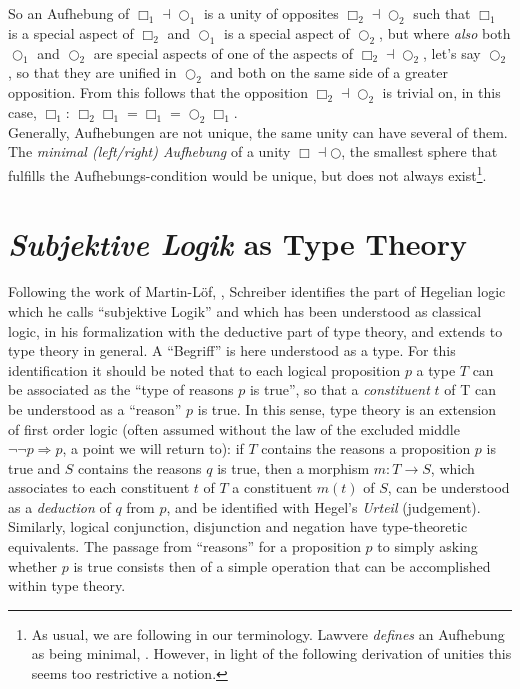 \documentclass{article}
\begin{document}
So an Aufhebung of $\Box_1\dashv\bigcirc_1$ is a unity of opposites $\Box_2\dashv\bigcirc_2$ such that
$\Box_1$ is a special aspect of $\Box_2$ and $\bigcirc_1$ is a special aspect of $\bigcirc_2$, but where
\emph{also} both $\bigcirc_1$ and $\bigcirc_2$ are special aspects of one of the aspects of $\Box_2\dashv\bigcirc_2$,
let's say $\bigcirc_2$, so that they are unified in $\bigcirc_2$ and both on the same side of a greater
opposition. From this follows that the opposition $\Box_2\dashv\bigcirc_2$ is trivial on, in this case,
$\Box_1$: $\Box_2\Box_1=\Box_1=\bigcirc_2\Box_1$. \\

Generally, Aufhebungen are not unique, the same unity can have several of them. The \emph{minimal (left/right)
Aufhebung} of a unity $\Box\dashv\bigcirc$, the smallest sphere that fulfills the Aufhebungs-condition
would be unique, but does not always exist\footnote{As usual, we are following \cite{nlabsol} in our terminology.
Lawvere \emph{defines} an Aufhebung as being minimal, \cite{Lawvere92}. However, in light of the following
derivation of unities this seems too restrictive a notion.}.


\section{\emph{Subjektive Logik} as Type Theory}
Following the work of Martin-Löf, \cite{Loef96}, Schreiber identifies the part of Hegelian logic which
he calls ``subjektive Logik'' and which has been understood as classical logic, in his formalization with
the deductive part of type theory, and extends to type theory in general. A ``Begriff'' is here understood
as a type. For this identification it should be noted that to each logical proposition $p$ a type $T$
can be associated as the ``type of reasons $p$ is true'', so that a \emph{constituent} $t$ of T can be
understood as a ``reason'' $p$ is true. In this sense, type theory is an extension of first order logic
(often assumed without the law of the excluded middle $\neg\neg p \Rightarrow p$, a point we will return
to): if $T$ contains the reasons a proposition $p$ is true and $S$ contains the reasons $q$ is true, then
a morphism $m:T\rightarrow S$, which associates to each constituent $t$ of $T$ a constituent $m(t)$ of
$S$, can be understood as a \emph{deduction} of $q$ from $p$, and be identified with Hegel's \emph{Urteil}
(judgement). Similarly, logical conjunction, disjunction and negation have type-theoretic equivalents.
The passage from ``reasons'' for a proposition $p$ to simply asking whether $p$ is true consists then
of a simple operation that can be accomplished within type theory. \\
\end{document}
